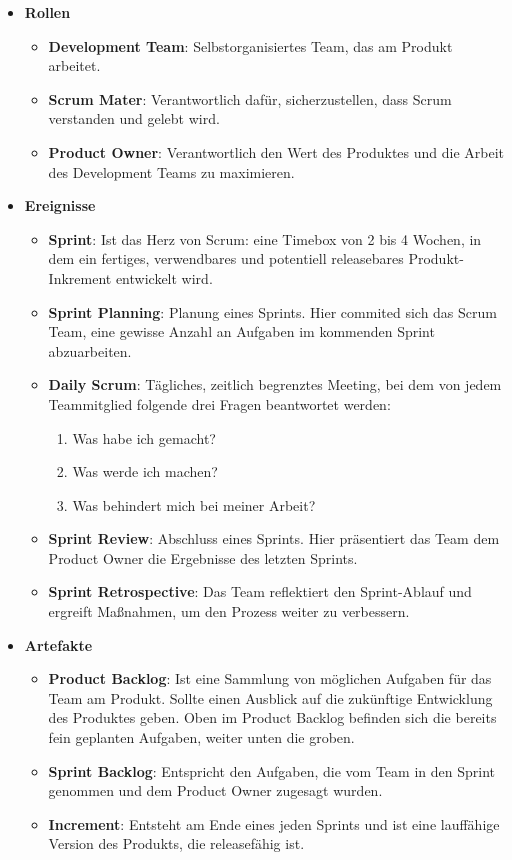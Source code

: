 \begin{itemize}
  \item \textbf{Rollen}
  \begin{itemize}
    \item \textbf{Development Team}: Selbstorganisiertes Team, das am Produkt arbeitet.
    \item \textbf{Scrum Mater}: Verantwortlich dafür, sicherzustellen, dass Scrum verstanden und gelebt wird.
    \item \textbf{Product Owner}: Verantwortlich den Wert des Produktes und die Arbeit des Development Teams zu maximieren.
  \end{itemize}
  \item \textbf{Ereignisse}
  \begin{itemize}
    \item \textbf{Sprint}: Ist das Herz von Scrum: eine Timebox von 2 bis 4 Wochen, in dem ein fertiges, verwendbares und potentiell releasebares Produkt-Inkrement entwickelt wird.
    \item \textbf{Sprint Planning}: Planung eines Sprints. Hier commited sich das Scrum Team, eine gewisse Anzahl an Aufgaben im kommenden Sprint abzuarbeiten.
    \item \textbf{Daily Scrum}: Tägliches, zeitlich begrenztes Meeting, bei dem von jedem Teammitglied folgende drei Fragen beantwortet werden:
    \begin{enumerate}
      \item Was habe ich gemacht?
      \item Was werde ich machen?
      \item Was behindert mich bei meiner Arbeit?
    \end{enumerate}
    \item \textbf{Sprint Review}: Abschluss eines Sprints. Hier präsentiert das Team dem Product Owner die Ergebnisse des letzten Sprints.
    \item \textbf{Sprint Retrospective}: Das Team reflektiert den Sprint-Ablauf und ergreift Maßnahmen, um den Prozess weiter zu verbessern.
  \end{itemize}
  \item \textbf{Artefakte}
  \begin{itemize}
    \item \textbf{Product Backlog}: Ist eine Sammlung von möglichen Aufgaben für das Team am Produkt. Sollte einen Ausblick auf die zukünftige Entwicklung des Produktes geben. Oben im Product Backlog befinden sich die bereits fein geplanten Aufgaben, weiter unten die groben.
    \item \textbf{Sprint Backlog}: Entspricht den Aufgaben, die vom Team in den Sprint genommen und dem Product Owner zugesagt wurden.
    \item \textbf{Increment}: Entsteht am Ende eines jeden Sprints und ist eine lauffähige Version des Produkts, die releasefähig ist.
  \end{itemize}
\end{itemize}

